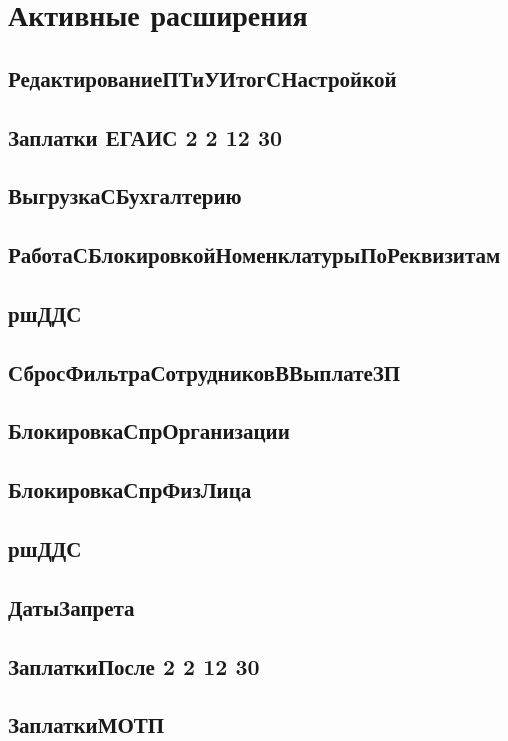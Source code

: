 \section{Активные расширения}

\subsection{РедактированиеПТиУИтогСНастройкой}\label{500}
\subsection{Заплатки ЕГАИС 2 2 12 30}\label{501}
\subsection{ВыгрузкаСБухгалтерию}\label{502}
\subsection{РаботаСБлокировкойНоменклатурыПоРеквизитам}\label{503}
\subsection{ршДДС}\label{504}
\subsection{СбросФильтраСотрудниковВВыплатеЗП}\label{505}
\subsection{БлокировкаСпрОрганизации}\label{506}
\subsection{БлокировкаСпрФизЛица}\label{507}
\subsection{ршДДС}\label{508}
\subsection{ДатыЗапрета}\label{509}
\subsection{ЗаплаткиПосле 2 2 12 30}\label{510}
\subsection{ЗаплаткиМОТП}\label{511}
